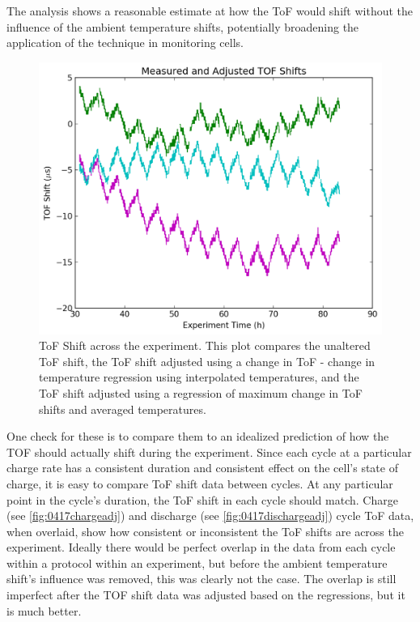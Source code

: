 The analysis shows a reasonable estimate at how the ToF would shift without the influence of the ambient temperature shifts, potentially broadening the application of the technique in monitoring cells.
\begin{figure}[t]\label{fig:0417tofshiftadj}
\includegraphics[width=\textwidth]{Thesis/0417tofshiftadj.png}
\centering
\caption{ToF Shift across the experiment. This plot compares the unaltered ToF shift, the ToF shift adjusted using a change in ToF - change in temperature regression using interpolated temperatures, and the ToF shift adjusted using a regression of maximum change in ToF shifts and averaged temperatures.}
\end{figure}

One check for these is to compare them to an idealized prediction of how the TOF should actually shift during the experiment. 
Since each cycle at a particular charge rate has a consistent duration and consistent effect on the cell's state of charge, it is easy to compare ToF shift data between cycles. 
At any particular point in the cycle's duration, the ToF shift in each cycle should match. Charge (see \hyperref[fig:0417chargeadj]{\cref{fig:0417chargeadj}}) and discharge (see \hyperref[fig:0417dischargeadj]{\cref{fig:0417dischargeadj}}) cycle ToF data, when overlaid, show how consistent or inconsistent the ToF shifts are across the experiment.
Ideally there would be perfect overlap in the data from each cycle within a protocol within an experiment, but before the ambient temperature shift's influence was removed, this was clearly not the case. 
The overlap is still imperfect after the TOF shift data was adjusted based on the regressions, but it is much better.

